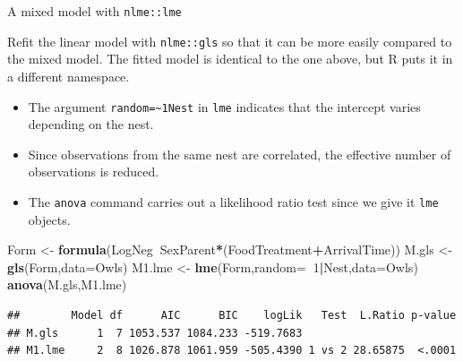 \documentclass[
  ignorenonframetext,
]{beamer}
\newenvironment{Shaded}{\begin{snugshade}}{\end{snugshade}}
\newcommand{\DataTypeTok}[1]{\textcolor[rgb]{0.13,0.29,0.53}{#1}}
\newcommand{\DecValTok}[1]{\textcolor[rgb]{0.00,0.00,0.81}{#1}}
\newcommand{\KeywordTok}[1]{\textcolor[rgb]{0.13,0.29,0.53}{\textbf{#1}}}
\newcommand{\NormalTok}[1]{#1}
\newcommand{\OperatorTok}[1]{\textcolor[rgb]{0.81,0.36,0.00}{\textbf{#1}}}
\newcommand{\StringTok}[1]{\textcolor[rgb]{0.31,0.60,0.02}{#1}}
\providecommand{\tightlist}{%
  \setlength{\itemsep}{0pt}\setlength{\parskip}{0pt}}
\begin{document}
\begin{frame}[fragile]{A mixed model with \texttt{nlme::lme}}
\protect\hypertarget{a-mixed-model-with-nlmelme}{}

Refit the linear model with \texttt{nlme::gls} so that it can be more
easily compared to the mixed model. The fitted model is identical to the
one above, but R puts it in a different namespace.

\begin{itemize}
\tightlist
\item
  The argument \texttt{random=\textasciitilde{}1\textbar{}Nest} in
  \texttt{lme} indicates that the intercept varies depending on the
  nest.
\item
  Since observations from the same nest are correlated, the effective
  number of observations is reduced.
\item
  The \texttt{anova} command carries out a likelihood ratio test since
  we give it \texttt{lme} objects.
\end{itemize}

\scriptsize

\begin{Shaded}
\begin{Highlighting}[]
\NormalTok{Form <-}\StringTok{ }\KeywordTok{formula}\NormalTok{(LogNeg}\OperatorTok{~}\NormalTok{SexParent}\OperatorTok{*}\NormalTok{(FoodTreatment}\OperatorTok{+}\NormalTok{ArrivalTime))}
\NormalTok{M.gls <-}\StringTok{ }\KeywordTok{gls}\NormalTok{(Form,}\DataTypeTok{data=}\NormalTok{Owls)}
\NormalTok{M1.lme <-}\StringTok{ }\KeywordTok{lme}\NormalTok{(Form,}\DataTypeTok{random=}\OperatorTok{~}\DecValTok{1}\OperatorTok{|}\NormalTok{Nest,}\DataTypeTok{data=}\NormalTok{Owls)}
\KeywordTok{anova}\NormalTok{(M.gls,M1.lme)}
\end{Highlighting}
\end{Shaded}

\begin{verbatim}
##        Model df      AIC      BIC    logLik   Test  L.Ratio p-value
## M.gls      1  7 1053.537 1084.233 -519.7683                        
## M1.lme     2  8 1026.878 1061.959 -505.4390 1 vs 2 28.65875  <.0001
\end{verbatim}

\end{frame}
\end{document}
